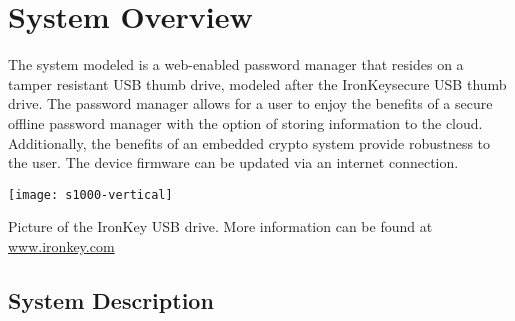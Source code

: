 \chapter{System Overview}
\label{ch:System Overview}
The system modeled is a web-enabled password manager that resides on a
tamper resistant USB thumb drive, modeled after the
IronKey\texttrademark secure USB thumb drive. The password manager
allows for a user to enjoy the benefits of a secure offline password
manager with the option of storing information to the cloud.
Additionally, the benefits of an embedded crypto system provide
robustness to the user.  The device firmware can be updated via an
internet connection.

\begin{marginfigure}%
\centering
  \texttt{[image: s1000-vertical]}
  \caption{Picture of the IronKey USB drive.  More information can be
found at \url{www.ironkey.com}}
  \label{fig:ik}
\end{marginfigure}



\section{System Description}
\label{sec:sysdesc}

